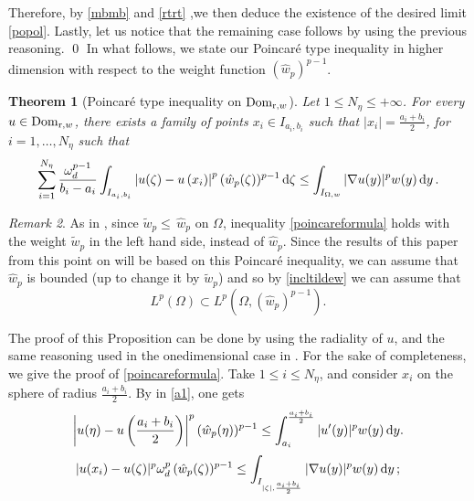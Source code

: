 \documentclass[11pt,leqno]{amsart}
\newtheorem{teo}{Theorem}[section]
\theoremstyle{remark}
\newtheorem{oss}[teo]{Remark}
\theoremstyle{definition}
\theoremstyle{definition}
\newcommand{\wstar}{{\hat w}}
\def\de{{\rm d}}
\begin{document}
Therefore, by \eqref{mbmb} and \eqref{rtrt} ,we then deduce the existence of the desired limit \eqref{popol}. Lastly, let us notice that the remaining case follows by using the previous reasoning.
\qed
In what follows, we state our Poincar\'e type inequality in higher dimension with respect to the weight function $(\hat{w}_{p})^{p-1}$.
\begin{teo}[Poincar\'e type inequality on ${\rm{Dom}}_{{\mathrm r},w}$]\label{Poin1}
Let $1\leq N_{\eta}\leq +\infty$. For every $u\in {\rm{Dom}}_{{\mathrm r},w}$,  there exists a family of points $x_{i}\in I_{a_{i},b_{i}}$ such that $\vert x_{i}\vert=\frac{a_i+b_i}{2}$, for $i=1,\ldots, N_{\eta}$ such that
\begin{equation}\label{poincareformula}
\sum_{i=1}^{N_{\eta}}\frac{\omega_{d}^{p-1}}{b_{i}-a_{i}}\int_{I_{a_{i},b_{i}}}
\left|u(\zeta)-u\left(x_{i}\right)\right|^{p}(\wstar_{p}(\zeta))^{p-1}\,\de \zeta\leq \int_{I_{\Omega,w}}|\nabla u(y)|^{p}w(y)\,\de y\,.
\end{equation}
\end{teo}
\begin{oss}\label{serra}
As in \cite[Theorem 4.11]{CC}, since $\tilde w_p\le\,\wstar_{p}$ on $\Omega$, inequality \eqref{poincareformula} holds with the weight $\tilde w_p$ in the left hand side, instead of $\wstar_{p}$. Since the results of this paper from this point on will be based on this Poincar\'e inequality,
we can assume that $\wstar_{p}$ is bounded (up to change it by $\tilde w_p$) and so by \eqref{incltildew} we can assume that
\begin{equation}\label{include}
L^p(\Omega)\subset L^{p}(\Omega,(\wstar_{p})^{p-1}).
\end{equation}
\end{oss}
\proof
The proof of this Proposition can be done by using the radiality of $u$, and the same reasoning used in the onedimensional case in \cite[Theorem 2.10]{CCMH1}. For the sake of completeness, we give the proof of \eqref{poincareformula}. Take $1\leq i \leq N_{\eta}$, and consider $x_{i}$ on the sphere of radius $\frac{a_i+b_i}{2}$. By in \eqref{a1}, one gets
\begin{equation*}
\left|u(\eta)-u\left(\frac{a_i+b_i}{2}\right)\right|^{p}(\wstar_{p}(\eta))^{p-1}\leq
\int_{a_i}^{\frac{a_i+b_i}{2}}|u'(y)|^{p}w(y)\,\de y.
\end{equation*}
\begin{align*}
|u(x_{i})-u(\zeta)|^{p}\omega_{d}^{p}\,(\wstar_{p}(\zeta))^{p-1}
\leq \int_{I_{\vert \zeta\vert,\frac{a_i+b_i}{2}}}|\nabla u(y)|^{p}w(y)\,\de y\,;
\end{align*}
\end{document}
